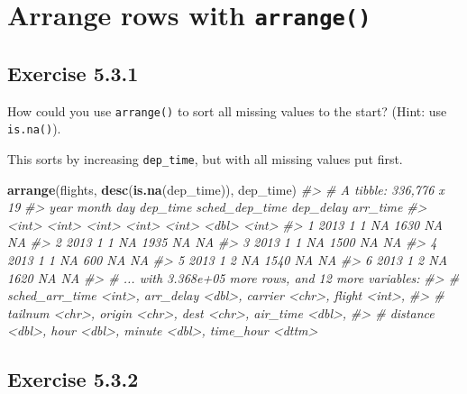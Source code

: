 \documentclass[]{book}
\newenvironment{Shaded}{\begin{snugshade}}{\end{snugshade}}
\newcommand{\CommentTok}[1]{\textcolor[rgb]{0.56,0.35,0.01}{\textit{#1}}}
\newcommand{\KeywordTok}[1]{\textcolor[rgb]{0.13,0.29,0.53}{\textbf{#1}}}
\newcommand{\NormalTok}[1]{#1}
\theoremstyle{plain}
\theoremstyle{remark}
\theoremstyle{definition}
\theoremstyle{definition}
\theoremstyle{definition}
\theoremstyle{remark}
\begin{document}
\hypertarget{arrange-rows-with-arrange}{%
\section{\texorpdfstring{Arrange rows with
\texttt{arrange()}}{Arrange rows with arrange()}}\label{arrange-rows-with-arrange}}

\hypertarget{exercise-5.3.1}{%
\subsection*{\texorpdfstring{Exercise
{5.3.1}}{Exercise 5.3.1}}\label{exercise-5.3.1}}

How could you use \texttt{arrange()} to sort all missing values to the
start? (Hint: use \texttt{is.na()}).

This sorts by increasing \texttt{dep\_time}, but with all missing values
put first.

\begin{Shaded}
\begin{Highlighting}[]
\KeywordTok{arrange}\NormalTok{(flights, }\KeywordTok{desc}\NormalTok{(}\KeywordTok{is.na}\NormalTok{(dep_time)), dep_time)}
\CommentTok{#> # A tibble: 336,776 x 19}
\CommentTok{#>    year month   day dep_time sched_dep_time dep_delay arr_time}
\CommentTok{#>   <int> <int> <int>    <int>          <int>     <dbl>    <int>}
\CommentTok{#> 1  2013     1     1       NA           1630        NA       NA}
\CommentTok{#> 2  2013     1     1       NA           1935        NA       NA}
\CommentTok{#> 3  2013     1     1       NA           1500        NA       NA}
\CommentTok{#> 4  2013     1     1       NA            600        NA       NA}
\CommentTok{#> 5  2013     1     2       NA           1540        NA       NA}
\CommentTok{#> 6  2013     1     2       NA           1620        NA       NA}
\CommentTok{#> # ... with 3.368e+05 more rows, and 12 more variables:}
\CommentTok{#> #   sched_arr_time <int>, arr_delay <dbl>, carrier <chr>, flight <int>,}
\CommentTok{#> #   tailnum <chr>, origin <chr>, dest <chr>, air_time <dbl>,}
\CommentTok{#> #   distance <dbl>, hour <dbl>, minute <dbl>, time_hour <dttm>}
\end{Highlighting}
\end{Shaded}

\hypertarget{exercise-5.3.2}{%
\subsection*{\texorpdfstring{Exercise
{5.3.2}}{Exercise 5.3.2}}\label{exercise-5.3.2}}
\end{document}
